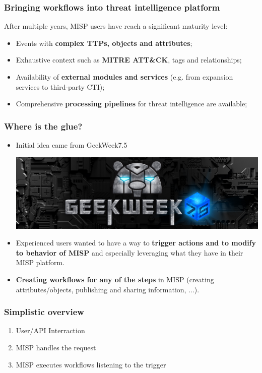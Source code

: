 
\begin{frame}[t,plain]
\titlepage
\end{frame}

\begin{frame}
    \frametitle{Bringing workflows into threat intelligence platform}
    After multiple years, MISP users have reach a significant maturity level:
    \begin{itemize}
        \item Events with {\bf complex TTPs, objects and attributes};
        \item Exhaustive context such as {\bf MITRE ATT\&CK}, tags and relationships;
        \item Availability of {\bf external modules and services} (e.g. from expansion services to third-party CTI);
        \item Comprehensive {\bf processing pipelines} for threat intelligence are available;
    \end{itemize}
\end{frame}

\begin{frame}
    \frametitle{Where is the glue?}
    \begin{itemize}
        \item Initial idea came from GeekWeek7.5
        \begin{center}
            \includegraphics[width=0.5\linewidth]{pictures/geekweek75.jpg}
        \end{center}
    \item Experienced users wanted to have a way to {\bf trigger actions and to modify to behavior of MISP} and especially leveraging what they have in their MISP platform.
    \item {\bf Creating workflows for any of the steps} in MISP (creating attributes/objects, publishing and sharing information, ...). 
    \end{itemize}
\end{frame}

\begin{frame}
    \frametitle{Simplistic overview}
    \begin{enumerate}
        \item User/API Interraction
        \item MISP handles the request
        \item MISP executes workflows listening to the trigger
    \end{enumerate}
\end{frame}

